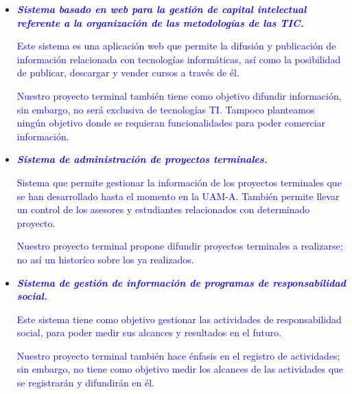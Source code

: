 \documentclass[11pt,letterpaper,titlepage]{article}
\begin{document}
\begin{itemize}

  \item \textcolor{blue}{\textit{\textbf{Sistema basado en web para la gesti\'on de capital intelectual referente a la organizaci\'on de las metodolog\'ias de las TIC.}}}

\textcolor{blue}{Este sistema es una aplicaci\'on web que permite la difusi\'on y publicaci\'on de informaci\'on relacionada con tecnolog\'ias inform\'aticas, as\'i como la posibilidad de publicar, descargar y vender cursos a trav\'es de \'el.}

\textcolor{blue}{Nuestro proyecto terminal tambi\'en tiene como objetivo difundir informaci\'on, sin embargo, no ser\'a exclusiva de tecnolog\'ias TI. Tampoco planteamos ning\'un objetivo donde se requieran funcionalidades para poder comerciar informaci\'on.}

  \item \textcolor{blue}{\textit{\textbf{Sistema de administraci\'on de proyectos terminales.}}}

\textcolor{blue}{Sistema que permite gestionar la informaci\'on de los proyectos terminales que se han desarrollado hasta el momento en la UAM-A. Tambi\'en permite llevar un control de los asesores y estudiantes relacionados con determinado proyecto.}

\textcolor{blue}{Nuestro proyecto terminal propone difundir proyectos terminales a realizarse; no as\'i un histor\'ico sobre los ya realizados.}

  \item \textcolor{blue}{\textit{\textbf{Sistema de gesti\'on de información de programas de responsabilidad social.}}}

\textcolor{blue}{Este sistema tiene como objetivo gestionar las actividades de responsabilidad social, para poder medir sus alcances y resultados en el futuro.}

\textcolor{blue}{Nuestro proyecto terminal tambi\'en hace \'enfasis en el registro de actividades; sin embargo, no tiene como objetivo medir los alcances de las actividades que se registrar\'an y difundir\'an en \'el.}

\end{itemize}
\end{document}
